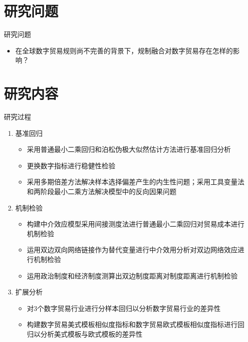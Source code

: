 \documentclass{beamer}
\begin{document}
\section{研究问题}
\begin{frame}{研究问题}
    \centering
    \large
    \begin{itemize}
        \item 在全球数字贸易规则尚不完善的背景下，规制融合对数字贸易存在怎样的影响？
    \end{itemize}
\end{frame}


\section{研究内容}
\begin{frame}{研究过程}
    \begin{enumerate}
        \item 基准回归
        \begin{itemize}
            \item {\footnotesize 采用普通最小二乘回归和泊松伪极大似然估计方法进行基准回归分析}
            \item {\footnotesize 更换数字指标进行稳健性检验}
            \item {\footnotesize 采用多期倍差方法解决样本选择偏差产生的内生性问题；采用工具变量法和两阶段最小二乘方法解决模型中的反向因果问题}
        \end{itemize}
        \item 机制检验
        \begin{itemize}
            \item {\footnotesize 构建中介效应模型采用间接测度法进行普通最小二乘回归对贸易成本进行机制检验}
            \item {\footnotesize 运用双边双向网络链接作为替代变量进行中介效用分析对双边网络效应进行机制检验}
            \item {\footnotesize 运用政治制度和经济制度测算出双边制度距离对制度距离进行机制检验}
        \end{itemize}
        \item 扩展分析
        \begin{itemize}
            \item {\footnotesize 对3个数字贸易行业进行分样本回归以分析数字贸易行业的差异性}
            \item {\footnotesize 构建数字贸易美式模板相似度指标和数字贸易欧式模板相似度指标进行回归以分析美式模板与欧式模板的差异性}
        \end{itemize}
    \end{enumerate}
\end{frame}
\end{document}
